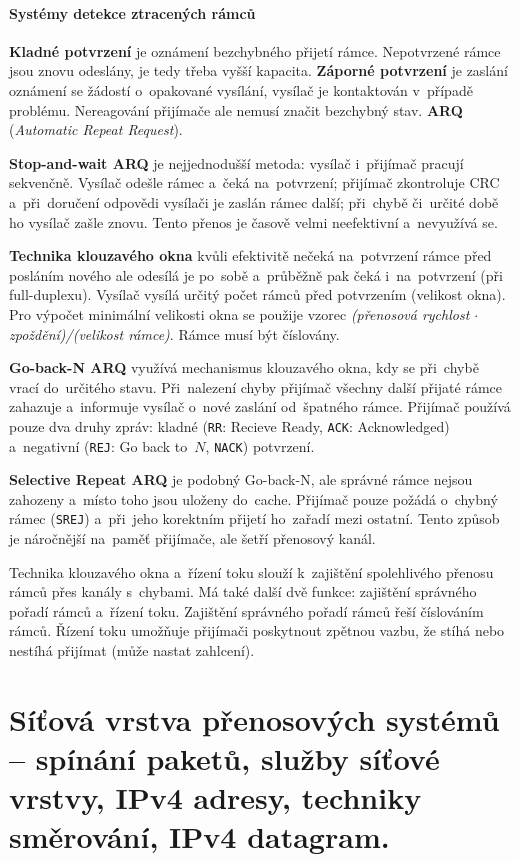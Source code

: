 \paragraph{Systémy detekce ztracených rámců} \textbf{Kladné potvrzení} je oznámení bezchybného přijetí rámce. Nepotvrzené rámce jsou znovu odeslány, je tedy třeba vyšší kapacita. \textbf{Záporné potvrzení} je zaslání oznámení se žádostí o~opakované vysílání, vysílač je kontaktován v~případě problému. Nereagování přijímače ale nemusí značit bezchybný stav. \textbf{ARQ} (\emph{Automatic Repeat Request}).

\textbf{Stop-and-wait ARQ} je nejjednodušší metoda: vysílač i~přijímač pracují sekvenčně. Vysílač odešle rámec a~čeká na~potvrzení; přijímač zkontroluje CRC a~při~doručení odpovědi vysílači je zaslán rámec další; při~chybě či~určité době ho vysílač zašle znovu. Tento přenos je časově velmi neefektivní a~nevyužívá se.

\textbf{Technika klouzavého okna} kvůli efektivitě nečeká na~potvrzení rámce před posláním nového ale odesílá je po~sobě a~průběžně pak čeká i~na~potvrzení (při full-duplexu). Vysílač vysílá určitý počet rámců před potvrzením (velikost okna). Pro výpočet minimální velikosti okna se použije vzorec \emph{(přenosová rychlost $\cdot$ zpoždění)/(velikost rámce)}. Rámce musí být číslovány.

\textbf{Go-back-N ARQ} využívá mechanismus klouzavého okna, kdy se při~chybě vrací do~určitého stavu. Při~nalezení chyby přijímač všechny další přijaté rámce zahazuje a~informuje vysílač o~nové zaslání od~špatného rámce. Přijímač používá pouze dva druhy zpráv: kladné (\texttt{RR}: Recieve Ready, \texttt{ACK}: Acknowledged) a~negativní (\texttt{REJ}: Go back to~$N$, \texttt{NACK}) potvrzení.

\textbf{Selective Repeat ARQ} je podobný Go-back-N, ale správné rámce nejsou zahozeny a~místo toho jsou uloženy do~cache. Přijímač pouze požádá o~chybný rámec (\texttt{SREJ}) a~při~jeho korektním přijetí ho~zařadí mezi ostatní. Tento způsob je náročnější na~paměť přijímače, ale šetří přenosový kanál.

Technika klouzavého okna a~řízení toku slouží k~zajištění spolehlivého přenosu rámců přes kanály s~chybami. Má také další dvě funkce: zajištění správného pořadí rámců a~řízení toku. Zajištění správného pořadí rámců řeší číslováním rámců. Řízení toku umožňuje přijímači poskytnout zpětnou vazbu, že stíhá nebo nestíhá přijímat (může nastat zahlcení).


\clearpage
\section{Síťová vrstva přenosových systémů -- spínání paketů, služby síťové vrstvy, IPv4 adresy, techniky směrování, IPv4 datagram.}

